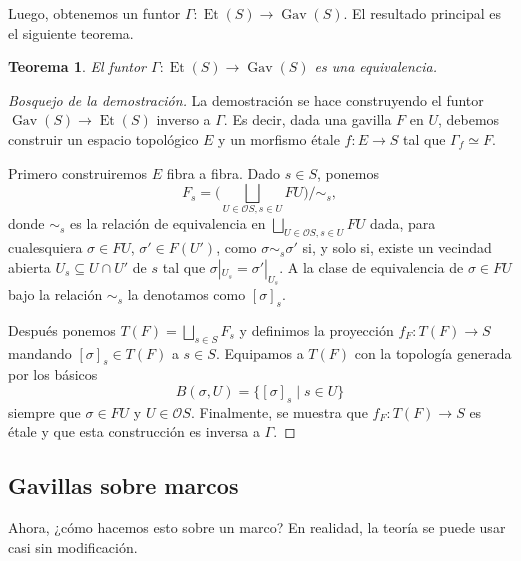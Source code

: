 \documentclass[12pt,letterpaper,titlepage]{article}
\newtheorem{thm}{Teorema}
\theoremstyle{definition}
\renewcommand\cal[1]{\mathcal{#1}}
\newcommand\simr{{\sim}}
\newcommand\<{\langle}
\renewcommand\>{\rangle}
\DeclareMathOperator{\Gav}{Gav}
\DeclareMathOperator{\Et}{Et}
\begin{document}
Luego, obtenemos un funtor $\Gamma:\Et(S)\to\Gav(S)$.
El resultado principal es el siguiente teorema.

\begin{thm}
    El funtor $\Gamma:\Et(S)\to\Gav(S)$ es una equivalencia.
\end{thm}
\begin{proof}[Bosquejo de la demostración]
    La demostración se hace construyendo el funtor
    $\Gav(S)\to\Et(S)$ inverso a $\Gamma$.
    Es decir, dada una gavilla $F$ en $U$,
    debemos construir un espacio topológico $E$ y un morfismo
    étale $f:E\to S$ tal que $\Gamma_f\simeq F$.
    
    Primero construiremos $E$ fibra a fibra.
    Dado $s\in S$, ponemos
    \[
        F_s = \Big(\bigsqcup_{U\in\cal OS,s\in U} FU\Big)/\simr_s
    ,\]
    donde $\sim_s$ es la relación de equivalencia en
    $\bigsqcup_{U\in\cal OS,s\in U}FU$ dada,
    para cualesquiera $\sigma\in FU$, $\sigma'\in F(U')$, como
    $\sigma\sim_s\sigma'$ si, y solo si, existe un vecindad abierta
    $U_s\subseteq U\cap U'$ de $s$
    tal que $\sigma|_{U_s}=\sigma'|_{U_s}$.
    A la clase de equivalencia de $\sigma\in FU$ bajo la relación
    $\sim_s$ la denotamos como $[\sigma]_s$.
    
    Después ponemos $T(F)=\bigsqcup_{s\in S}F_s$
    y definimos la proyección $f_F:T(F)\to S$
    mandando $[\sigma]_s\in T(F)$ a $s\in S$.
    Equipamos a $T(F)$ con la topología generada por los básicos
    \[
        B(\sigma,U) = \{[\sigma]_s\mid s\in U\}
    \]
    siempre que $\sigma\in FU$ y $U\in\cal OS$.
    Finalmente, se muestra que $f_F:T(F)\to S$ es étale
    y que esta construcción es inversa a $\Gamma$.
\end{proof}

\subsection{Gavillas sobre marcos}
Ahora, ¿cómo hacemos esto sobre un marco?
En realidad, la teoría se puede usar casi sin modificación.
\end{document}
